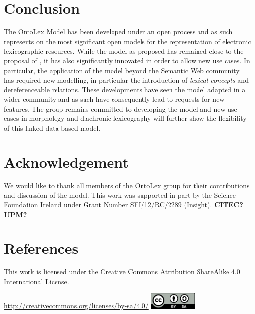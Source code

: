 \documentclass[12pt,a4paper]{elex2017}
\begin{document}
\section{Conclusion}

The OntoLex Model has been developed under an open process and as such
represents on the most significant open models for the representation of
electronic lexicographic resources. While the model as proposed has remained
close to the proposal of \cite{mccrae2012interchanging}, it has also
significantly innovated in order to allow new use cases. In particular, the
application of the model beyond the Semantic Web community has required new
modelling, in particular the introduction of \emph{lexical concepts} and
dereferenceable relations. These developments have seen the model adapted in a
wider community and as such have consequently lead to requests for new features.
The group remains committed to developing the model and new use cases in
morphology and diachronic lexicography will further show the flexibility of this
linked data based model.

\section*{Acknowledgement} 

We would like to thank all members of the OntoLex group for their contributions
and discussion of the model. This work was supported in part by the Science Foundation Ireland under Grant
Number SFI/12/RC/2289 (Insight). \textbf{CITEC?} \textbf{UPM?}

\section*{References}

\printbibliography[
    type={book},
    notkeyword={dictionary},
    title={Books}
]
\printbibliography[
    type={incollection},
    title={Book Sections}
]
\printbibliography[
    type={inproceedings},
    title={Paper in conference proceedings}
]
\printbibliography[
    type={article},
    title={Journal Articles}
]
\printbibliography[
    type={misc},
    title={Technical Reports}
]
\printbibliography[
    type={book},
    keyword={dictionary},
    title={Dictionaries}
]


\medskip
\begin{minipage}[t]{\textwidth}
    \noindent This work is licensed under the Creative Commons Attribution
    ShareAlike 4.0 International License.
    \vspace{-2ex}
    \begin{center}%
        \url{http://creativecommons.org/licenses/by-sa/4.0/}\linebreak
        \includegraphics[width=2.33cm]{cc.png}%
    \end{center}
\end{minipage}
\end{document}
